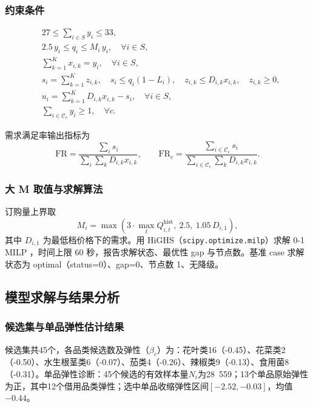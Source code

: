 \subsubsection{约束条件}
\begin{align}
& 27\le \sum_{i\in S}y_i\le 33, \tag{1} \\
& 2.5\,y_i\le q_i\le M_i\,y_i,\quad \forall i\in S, \tag{2} \\
& \sum_{k=1}^{K}x_{i,k}=y_i,\quad \forall i\in S, \tag{3} \\
& s_i=\sum_{k=1}^{K}z_{i,k},\quad s_i\le q_i(1-L_i),\quad z_{i,k}\le D_{i,k}x_{i,k},\quad z_{i,k}\ge 0, \tag{4} \\
& u_i=\sum_{k=1}^{K}D_{i,k}x_{i,k}-s_i,\quad \forall i\in S, \tag{5} \\
& \sum_{i\in\mathcal{C}_c}y_i\ge 1,\quad \forall c. \tag{6}
\end{align}

需求满足率输出指标为
\begin{equation}
\mathrm{FR}=\frac{\sum_i s_i}{\sum_i\sum_k D_{i,k}x_{i,k}},\qquad 
\mathrm{FR}_c=\frac{\sum_{i\in\mathcal{C}_c}s_i}{\sum_{i\in\mathcal{C}_c}\sum_k D_{i,k}x_{i,k}}.
\end{equation}

\subsubsection{大 M 取值与求解算法}

订购量上界取
\begin{equation}
M_i=\max\left(3\cdot\max_{t}Q_{i,t}^{\mathrm{hist}},\ 2.5,\ 1.05\,D_{i,1}\right),
\end{equation}
其中 $D_{i,1}$ 为最低档价格下的需求。用 HiGHS（\texttt{scipy.optimize.milp}）求解 0-1 MILP \cite{huangfu2018}，时间上限 60 秒，报告求解状态、最优性 gap 与节点数。基准 case 求解状态为 optimal（status=0）、gap=0、节点数 1、无降级。

\subsection{模型求解与结果分析}

\subsubsection{候选集与单品弹性估计结果}

候选集共45个，各品类候选数及弹性（$\beta_c$）为：花叶类16（-0.45）、花菜类2（-0.50）、水生根茎类6（-0.07）、茄类4（-0.26）、辣椒类9（-0.13）、食用菌8（-0.31）。单品弹性诊断：45个候选的有效样本量$N_i$为28~559；13个单品原始弹性为正，其中12个借用品类弹性；选中单品收缩弹性区间$[-2.52,-0.03]$，均值$-0.44$。

